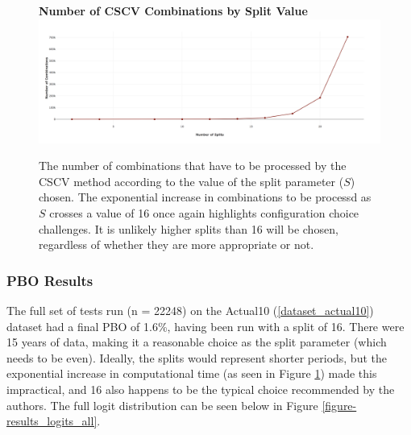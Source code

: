 \documentclass[a4paper,11pt,oneside]{article}
\theoremstyle{plain}
\theoremstyle{definition}
\begin{document}
	\begin{figure}[H]
		\centering 
		\textbf{Number of CSCV Combinations by Split Value}
		\includegraphics[scale=0.25]{images/results/pbo/combination_sizes.png} 
		\caption[Number of CSCV Combinations by Split Value]{
			\newline The number of combinations that have to be processed by the CSCV method according to the value of the split parameter ($S$) chosen. The exponential increase in combinations to be processd as $S$ crosses a value of 16 once again highlights configuration choice challenges. It is unlikely higher splits than 16 will be chosen, regardless of whether they are more appropriate or not.}
		\label{figure-s_combinations}
	\end{figure}
	
	
	\subsubsection{PBO Results}\label{results_pbo_stats}
	
	
	The full set of tests run (n = 22248) on the Actual10 (\ref{dataset_actual10}) dataset had a final PBO of 1.6\%, having been run with a split of 16. There were 15 years of data, making it a reasonable choice as the split parameter (which needs to be even). Ideally, the splits would represent shorter periods, but the exponential increase in computational time (as seen in Figure \ref{figure-s_combinations}) made this impractical, and 16 also happens to be the typical choice recommended by the authors. The full logit distribution can be seen below in Figure \ref{figure-results_logits_all}.
	
\end{document}
